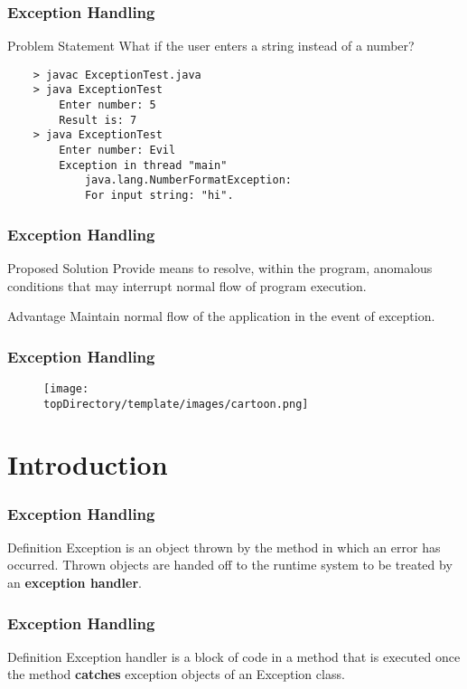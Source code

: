 \documentclass[10pt, compress]{beamer}
\begin{document}
\begin{frame}[fragile]
	\frametitle{Exception Handling}
	\begin{block}{Problem Statement}
		What if the user enters a string instead of a number?
\begin{verbatim}
	> javac ExceptionTest.java
	> java ExceptionTest
		Enter number: 5
		Result is: 7
	> java ExceptionTest
		Enter number: Evil
		Exception in thread "main"
			java.lang.NumberFormatException:
			For input string: "hi".
\end{verbatim}
	\end{block}
\end{frame}

\begin{frame}[fragile]
	\frametitle{Exception Handling}
	\begin{block}{Proposed Solution}
		Provide means to resolve, within the program, anomalous conditions that may interrupt normal flow of program execution.
	\end{block}
	\begin{block}{Advantage}
		Maintain normal flow of the application in the event of exception.
	\end{block}
\end{frame}

\begin{frame}[fragile]
	\frametitle{Exception Handling}
	\begin{figure}
		\texttt{[image: \\topDirectory/template/images/cartoon.png]}
	\end{figure}
\end{frame}

\section{Introduction}

\begin{frame}[fragile]
	\frametitle{Exception Handling}
	\begin{block}{Definition}
		Exception is an object thrown by the method in which an error has occurred. Thrown objects are handed off to the runtime system to be treated by an \textbf{exception handler}.
	\end{block}
\end{frame}

\begin{frame}[fragile]
	\frametitle{Exception Handling}
	\begin{block}{Definition}
		Exception handler is a block of code in a method that is executed once the method \textbf{catches} exception objects of an Exception class.
	\end{block}
\end{frame}
\end{document}
